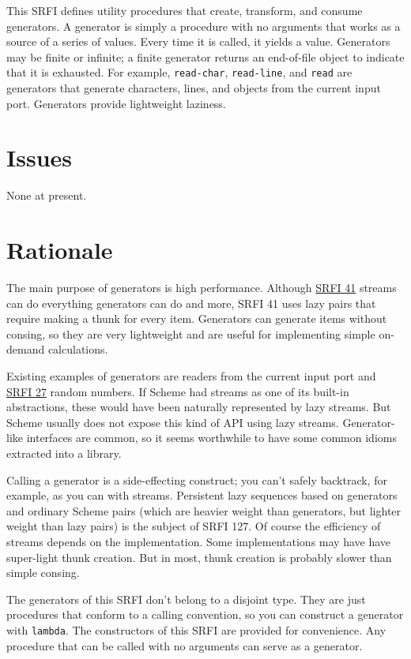 This SRFI defines utility procedures that create, transform, and consume
generators. A generator is simply a procedure with no arguments that
works as a source of a series of values. Every time it is called, it
yields a value. Generators may be finite or infinite; a finite generator
returns an end-of-file object to indicate that it is exhausted. For
example, \texttt{read-char}, \texttt{read-line}, and \texttt{read} are
generators that generate characters, lines, and objects from the current
input port. Generators provide lightweight laziness.

\section{Issues}\label{issues}

None at present.

\section{Rationale}\label{rationale}

The main purpose of generators is high performance. Although
\href{http://srfi.schemers.org/srfi-41/srfi-41.html}{SRFI 41} streams
can do everything generators can do and more, SRFI 41 uses lazy pairs
that require making a thunk for every item. Generators can generate
items without consing, so they are very lightweight and are useful for
implementing simple on-demand calculations.

Existing examples of generators are readers from the current input port
and \href{http://srfi.schemers.org/srfi-27/srfi-27.html}{SRFI 27} random
numbers. If Scheme had streams as one of its built-in abstractions,
these would have been naturally represented by lazy streams. But Scheme
usually does not expose this kind of API using lazy streams.
Generator-like interfaces are common, so it seems worthwhile to have
some common idioms extracted into a library.

Calling a generator is a side-effecting construct; you can't safely
backtrack, for example, as you can with streams. Persistent lazy
sequences based on generators and ordinary Scheme pairs (which are
heavier weight than generators, but lighter weight than lazy pairs) is
the subject of SRFI 127. Of course the efficiency of streams depends on
the implementation. Some implementations may have have super-light thunk
creation. But in most, thunk creation is probably slower than simple
consing.

The generators of this SRFI don't belong to a disjoint type. They are
just procedures that conform to a calling convention, so you can
construct a generator with \texttt{lambda}. The constructors of this
SRFI are provided for convenience. Any procedure that can be called with
no arguments can serve as a generator.

